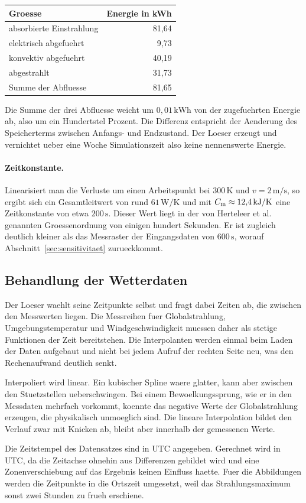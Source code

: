\begin{center}
\begin{tabular}{lr}
  \toprule
  Groesse & Energie in kWh \\
  \midrule
  absorbierte Einstrahlung & 81{,}64 \\
  elektrisch abgefuehrt    &  9{,}73 \\
  konvektiv abgefuehrt     & 40{,}19 \\
  abgestrahlt              & 31{,}73 \\
  \midrule
  Summe der Abfluesse      & 81{,}65 \\
  \bottomrule
\end{tabular}
\end{center}

Die Summe der drei Abfluesse weicht um $0{,}01\,\mathrm{kWh}$ von der
zugefuehrten Energie ab, also um ein Hundertstel Prozent. Die Differenz
entspricht der Aenderung des Speicherterms zwischen Anfangs- und Endzustand.
Der Loeser erzeugt und vernichtet ueber eine Woche Simulationszeit also
keine nennenswerte Energie.

\paragraph{Zeitkonstante.}
Linearisiert man die Verluste um einen Arbeitspunkt bei $300\,\mathrm{K}$
und $v = 2\,\mathrm{m/s}$, so ergibt sich ein Gesamtleitwert von rund
$61\,\mathrm{W/K}$ und mit $C_\mathrm{m} \approx 12{,}4\,\mathrm{kJ/K}$ eine
Zeitkonstante von etwa $200\,\mathrm{s}$. Dieser Wert liegt in der von
Herteleer et al.~\cite{herteleer2023} genannten Groessenordnung von einigen
hundert Sekunden. Er ist zugleich deutlich kleiner als das Messraster der
Eingangsdaten von $600\,\mathrm{s}$, worauf Abschnitt~\ref{sec:sensitivitaet}
zurueckkommt.

\subsection{Behandlung der Wetterdaten}

Der Loeser waehlt seine Zeitpunkte selbst und fragt dabei Zeiten ab, die
zwischen den Messwerten liegen. Die Messreihen fuer Globalstrahlung,
Umgebungstemperatur und Windgeschwindigkeit muessen daher als stetige
Funktionen der Zeit bereitstehen. Die Interpolanten werden einmal beim Laden
der Daten aufgebaut und nicht bei jedem Aufruf der rechten Seite neu, was
den Rechenaufwand deutlich senkt.

Interpoliert wird linear. Ein kubischer Spline waere glatter, kann aber
zwischen den Stuetzstellen ueberschwingen. Bei einem Bewoelkungssprung, wie
er in den Messdaten mehrfach vorkommt, koennte das negative Werte der
Globalstrahlung erzeugen, die physikalisch unmoeglich sind. Die lineare
Interpolation bildet den Verlauf zwar mit Knicken ab, bleibt aber innerhalb
der gemessenen Werte.

Die Zeitstempel des Datensatzes sind in UTC angegeben. Gerechnet wird in
UTC, da die Zeitachse ohnehin aus Differenzen gebildet wird und eine
Zonenverschiebung auf das Ergebnis keinen Einfluss haette. Fuer die
Abbildungen werden die Zeitpunkte in die Ortszeit umgesetzt, weil das
Strahlungsmaximum sonst zwei Stunden zu frueh erschiene.
